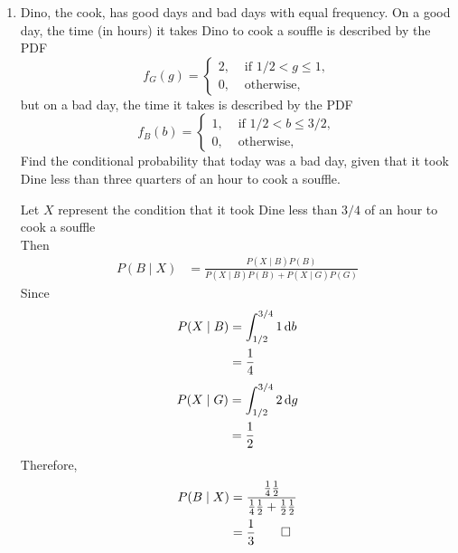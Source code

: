 \documentclass[paper=usletter, fontsize=12pt]{article}
\begin{document}
\begin{enumerate}
\begin{cproof}
        \end{cproof}

        \item Dino, the cook, has good days and bad days with equal frequency.
        On a good day, the time (in hours) it takes Dino to cook a souffle is
        described by the PDF
        \begin{equation*}
            f_G(g) = \begin{cases}
                2, & \text{ if } 1/2 < g \le 1,\\
                0, & \text{ otherwise, }
            \end{cases}
        \end{equation*}
        but on a bad day, the time it takes is described by the PDF
        \begin{equation*}
            f_B(b) = \begin{cases}
                1, & \text{ if } 1/2 < b \le 3/2,\\
                0, & \text{ otherwise, }
            \end{cases}
        \end{equation*}
        Find the conditional probability that today was a bad day, given that
        it took Dine less than three quarters of an hour to cook a souffle.
        \begin{cproof}

            Let $X$ represent the condition that it took Dine less than $3/4$
            of an hour to cook a souffle\\
            Then
            \begin{align*}
                P(B \mid X) & = \frac{P(X \mid B)P(B)}{P(X \mid B)P(B) + P(X \mid G)P(G)}
            \end{align*}
            Since
            \begin{align*}
                P(X \mid B) &= \int_{1/2}^{3/4}1\mathop{}\!\mathrm{d} b\\
                & = \frac{1}{4}
            \end{align*}
            \endgroup
            \begin{align*}
                P(X \mid G) &= \int_{1/2}^{3/4}2\mathop{}\!\mathrm{d} g\\
                & = \frac{1}{2}
            \end{align*}
            \endgroup
            Therefore,
            \begin{align*}
                P(B \mid X) & = \frac{\frac{1}{4}\frac{1}{2}}{\frac{1}{4}\frac{1}{2} + \frac{1}{2}\frac{1}{2}}\\
                & = \frac{1}{3} \qedhere
            \end{align*}
            \endgroup


\end{cproof}
\end{enumerate}
\end{document}
